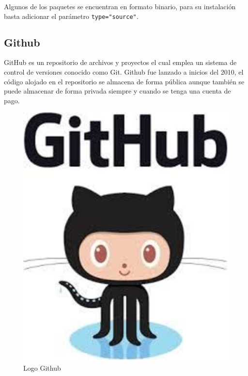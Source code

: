 \documentclass[11pt,a4paper,oneside]{book}\usepackage[]{graphicx}\usepackage[]{color}
\begin{document}
\begin{itemize}
Algunos de los paquetes se encuentran en formato binario, para su instalación basta adicionar el parámetro \texttt{type="source"}.

\subsection{Github}

GitHub es un repositorio de archivos y proyectos el cual emplea un sistema de control de versiones conocido como Git. Github fue lanzado a inicios del 2010, el código alojado en el repositorio se almacena de forma pública aunque también se puede almacenar de forma privada siempre y cuando se tenga una cuenta de pago.

\begin{figure}[H]
\centering
\includegraphics[scale=.45]{figuras/github.eps}
\caption{Logo Github}
\label{github}
\end{figure}


\end{itemize}
\end{document}
